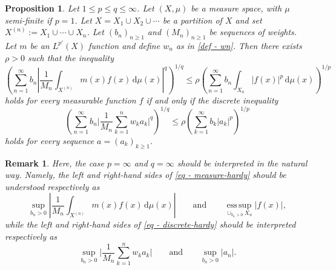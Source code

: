 \documentclass[oneside,10pt]{article}          %
\newtheorem{prop}{Proposition}
\newtheorem{rem}{Remark}
\numberwithin{equation}{section}
\begin{document}
\begin{prop}\label{prop - equiv}
Let $1\leq p\leq q\leq\infty$. Let $(X,\mu)$ be a measure space, with $\mu$ semi-finite if $p=1$. Let $X = X_1 \cup X_2 \cup \cdots$ be a partition of $X$ and set $X^{(n)} := X_1 \cup \cdots \cup X_n$. Let $(b_n)_{n\geq 1}$ and $(M_n)_{n\geq 1}$ be sequences of weights. Let $m$ be an $L^{p'} (X)$ function and define $w_n$ as in \eqref{def - wn}. Then there exists $\rho>0$ such that the inequality
\begin{equation}\label{eq - measure-hardy}
    \left(\sum_{n=1}^{\infty} b_n \left| \frac{1}{M_n} \int_{X^{(n)}}m(x)f(x)\,\mathrm{d}\mu(x) \right|^q\right)^{\!\!1/q}\! \leq \rho \left(\sum_{n=1}^{\infty} b_n \int_{X_n}|f(x)|^p\,\mathrm{d}\mu(x) \right)^{\!\!1/p}
\end{equation}
holds for every measurable function $f$ if and only if the discrete inequality
\begin{equation}\label{eq - discrete-hardy}
    \left(\sum_{n=1}^{\infty} b_n \bigg|\frac{1}{M_n} \sum_{k=1}^{n}w_k a_k \bigg|^q \right)^{\!\!1/q}\! \leq \rho \left(\sum_{k=1}^{\infty} b_k |a_k|^p\right)^{\!\!1/p}
\end{equation}
holds for every sequence $a=(a_k)_{k\geq 1}$.%
\end{prop}


\begin{rem}\label{rem - explain}
    Here, the case $p=\infty$ and $q=\infty$ should be interpreted in the natural way. Namely, the left and right-hand sides of \eqref{eq - measure-hardy} should be understood respectively as %
    \[
    \sup_{b_n>0} \left| \frac{1}{M_n} \int_{X^{(n)}}m(x)f(x)\,\mathrm{d}\mu(x) \right| \qquad\text{and}\qquad \operatorname*{ess\,sup}_{\cup_{b_n> 0} X_n}|f(x)|,
    \]
    while the left and right-hand sides of \eqref{eq - discrete-hardy} should be interpreted respectively as
    \[
    \sup_{b_n>0} \bigg|\frac{1}{M_n} \sum_{k=1}^{n}w_k a_k \bigg| \qquad\text{and}\qquad \sup_{b_n>0}|a_n|.
    \]
\end{rem}
\end{document}
